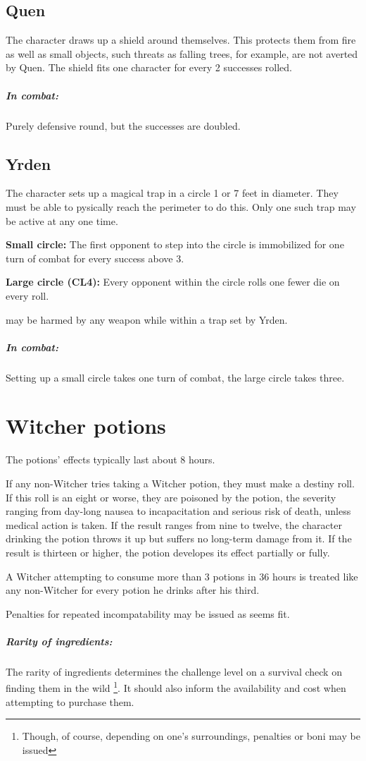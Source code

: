 \documentclass[parskip=full,11pt,%
footheight=38pt]{scrreport}
\begin{document}
\subsection{Quen}
The character draws up a shield around themselves. This protects them from fire as well as small objects, such threats as
falling trees, for example, are not averted by Quen. The shield fits one character for every 2 successes rolled.

\subparagraph{In combat:} Purely defensive round, but the successes are doubled.

\subsection{Yrden}
The character sets up a magical trap in a circle 1 or 7 feet in diameter. They must be able to pysically reach the perimeter to do this. Only one such trap may be active at any one time.

\textbf{Small circle:} The first opponent to step into the circle is immobilized for one turn of combat for every success above 3.

\textbf{Large circle (CL4):} Every opponent within the circle rolls one fewer die on every roll.

 may be harmed by any weapon while within a trap set by Yrden.

\subparagraph{In combat:} Setting up a small circle takes one turn of combat, the large circle takes three.

\section{Witcher potions}\label{rule:witcher_potions}
The potions' effects typically last about 8 hours.

If any non-Witcher tries taking a Witcher potion, they must make a destiny roll. If this roll is an eight or worse,
they are poisoned by the potion, the severity ranging from day-long nausea to incapacitation and serious risk of death,
unless medical action is taken. If the result ranges from nine to twelve, the character drinking the potion throws it
up but suffers no long-term damage from it. If the result is thirteen or higher, the potion developes its effect
partially or fully.

A Witcher attempting to consume more than 3 potions in 36 hours is treated like any non-Witcher for every potion he drinks
after his third.

Penalties for repeated incompatability may be issued as seems fit.
\\[2ex]
\subparagraph{Rarity of ingredients:}
The rarity of ingredients determines the challenge level on a survival check on finding them in the wild%
\footnote{Though, of course, depending on one's surroundings, penalties or boni may be issued}.
It should also inform the availability and cost when attempting to purchase them.
\end{document}
